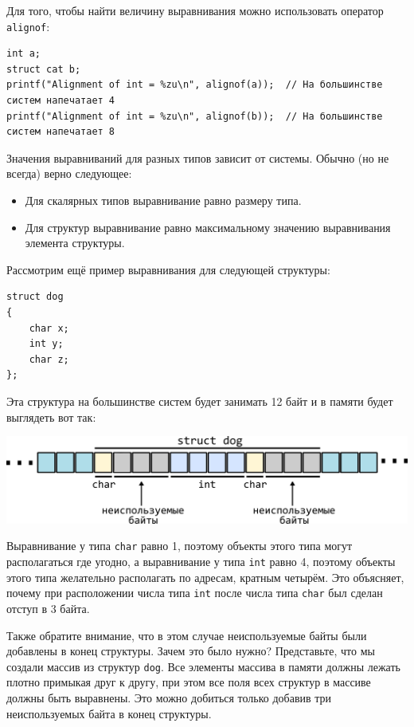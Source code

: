 \documentclass[10pt]{article}
\begin{document}
\noindent Для того, чтобы найти величину выравнивания можно использовать оператор \texttt{alignof}:
\begin{lstlisting}
int a;
struct cat b;
printf("Alignment of int = %zu\n", alignof(a));  // На большинстве систем напечатает 4
printf("Alignment of int = %zu\n", alignof(b));  // На большинстве систем напечатает 8
\end{lstlisting}
Значения выравниваний для разных типов зависит от системы. Обычно (но не всегда) верно следующее:
\begin{itemize}
\item Для скалярных типов выравнивание равно размеру типа.
\item Для структур выравнивание равно максимальному значению выравнивания элемента структуры.
\end{itemize}
 

\newpage
\noindent Рассмотрим ещё пример выравнивания для следующей структуры:
\begin{lstlisting}
struct dog 
{
    char x;
    int y;
    char z;
};
\end{lstlisting}
Эта структура на большинстве систем будет занимать 12 байт и в памяти будет выглядеть вот так:
\begin{center}
\includegraphics[scale=1]{../images/alignment2.png}
\end{center}
Выравнивание у типа \texttt{char} равно 1, поэтому объекты этого типа могут располагаться где угодно, а выравнивание у типа \texttt{int} равно 4, поэтому объекты этого типа желательно располагать по адресам, кратным четырём. Это объясняет, почему при расположении числа типа \texttt{int} после числа типа \texttt{char} был сделан отступ в 3 байта.

Также обратите внимание, что в этом случае неиспользуемые байты были добавлены в конец структуры. Зачем это было нужно? Представьте, что мы создали массив из структур \texttt{dog}. Все элементы массива в памяти должны лежать плотно примыкая друг к другу, при этом все поля всех структур в массиве должны быть выравнены. Это можно добиться только добавив три неиспользуемых байта в конец структуры.
\end{document}

